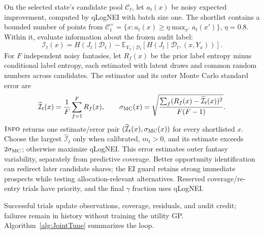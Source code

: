 \documentclass[runningheads]{llncs}
\begin{document}
On the selected state's candidate pool $\mathcal C_t$, let $a_t(x)$ be
noisy expected improvement, computed by qLogNEI with batch size one.
The shortlist contains a bounded number of points from
$\mathcal C_t^+=\{x:a_t(x)\geq\eta\max_{x'}a_t(x')\}$, $\eta=0.8$.
Within it, evaluate information about the frozen audit label:
\begin{equation}
 \mathcal I_t(x)=H(J_t\mid\mathcal D_t)-
 \mathbb E_{Y_x\mid\mathcal D_t}
       [H(J_t\mid\mathcal D_t,(x,Y_x))].
 \label{eq:ct-information}
\end{equation}
For $F$ independent noisy fantasies, let $R_f(x)$ be the prior label
entropy minus conditional label entropy, each estimated with latent draws
and common random numbers across candidates. The estimator and its outer
Monte Carlo standard error are
\begin{equation}
 \widehat{\mathcal I}_t(x)=\frac1F\sum_{f=1}^F R_f(x),\qquad
 \sigma_{\rm MC}(x)=\sqrt{\frac{\sum_f
 (R_f(x)-\widehat{\mathcal I}_t(x))^2}{F(F-1)}}.
 \label{eq:ct-mc-error}
\end{equation}
$\textsc{Info}$ returns one estimate/error pair
$(\widehat{\mathcal I}_t(x),\sigma_{\rm MC}(x))$ for every shortlisted $x$.
Choose the largest $\widehat{\mathcal I}_t$ only when calibrated, $m_t>0$,
and its estimate exceeds $2\sigma_{\rm MC}$; otherwise maximize qLogNEI.
This error estimates outer fantasy variability, separately from predictive
coverage. Better opportunity identification can redirect later candidate
shares; the EI guard retains strong immediate prospects while testing
allocation-relevant alternatives. Reserved coverage/re-entry trials have
priority, and the final $\gamma$ fraction uses qLogNEI.

Successful trials update observations, coverage, residuals, and audit
credit; failures remain in history without training the utility GP.
Algorithm~\ref{alg:JointTune} summarizes the loop.
\end{document}
